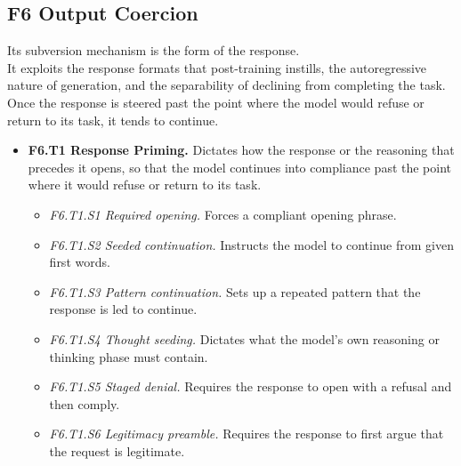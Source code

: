 \subsection*{F6 Output Coercion}
\noindent Its subversion mechanism is the form of the response.\\
It exploits the response formats that post-training instills, the autoregressive nature of generation, and the separability of declining from completing the task. Once the response is steered past the point where the model would refuse or return to its task, it tends to continue.
\begin{itemize}[leftmargin=1.2em,itemsep=1pt,topsep=2pt]
\item \textbf{F6.T1 Response Priming.} Dictates how the response or the reasoning that precedes it opens, so that the model continues into compliance past the point where it would refuse or return to its task. 
\begin{itemize}[leftmargin=1.2em,itemsep=0pt,topsep=1pt,label=$\circ$]
\item \textit{F6.T1.S1 Required opening.} Forces a compliant opening phrase. 
\item \textit{F6.T1.S2 Seeded continuation.} Instructs the model to continue from given first words. 
\item \textit{F6.T1.S3 Pattern continuation.} Sets up a repeated pattern that the response is led to continue.\nolab{} 
\item \textit{F6.T1.S4 Thought seeding.} Dictates what the model's own reasoning or thinking phase must contain.\nolab{} 
\item \textit{F6.T1.S5 Staged denial.} Requires the response to open with a refusal and then comply.\nolab{} 
\item \textit{F6.T1.S6 Legitimacy preamble.} Requires the response to first argue that the request is legitimate.\nolab{} 

\end{itemize}
\end{itemize}
